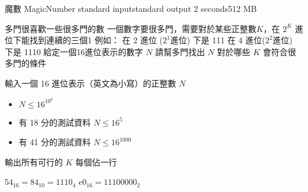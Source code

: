 \gdef\thisproblemauthor{}
\gdef\thisproblemdeveloper{}
\gdef\thisproblemorigin{}
\begin{problem}{魔數 MagicNumber}
{standard input}{standard output}
{2 seconds}{512 MB}{}

多門很喜歡一些很多門的數\newline
一個數字要很多門，需要對於某些正整數$K$，在 $2^K$ 進位下能找到連續的三個1\newline
\newline
例如： 在 2 進位 ($2^1$進位) 下是 111 在 4 進位($2^2$進位) 下是 1110\newline
\newline
給定一個16進位表示的數字 $N$\newline
請幫多門找出 $N$ 對於哪些 $K$ 會符合很多門的條件\newline

\InputFile

輸入一個 16 進位表示（英文為小寫）的正整數 $N$
\begin{iofmt}
\begin{itemize}
	\item $N \leq 16^{10^6}$
	\item 有 18 分的測試資料 $N \leq 16^5$
	\item 有 41 分的測試資料 $N \leq 16^{1000}$
\end{itemize}
\end{iofmt}

\OutputFile

輸出所有可行的 $K$ \newline
每個佔一行

\Examples

\begin{example}
%
%
%
\end{example}
$54_{16} = 84_{10} = 1110_4$ \newline
$\textrm{e}0_{16} = 1110 0000_2$ \newline

\end{problem}
